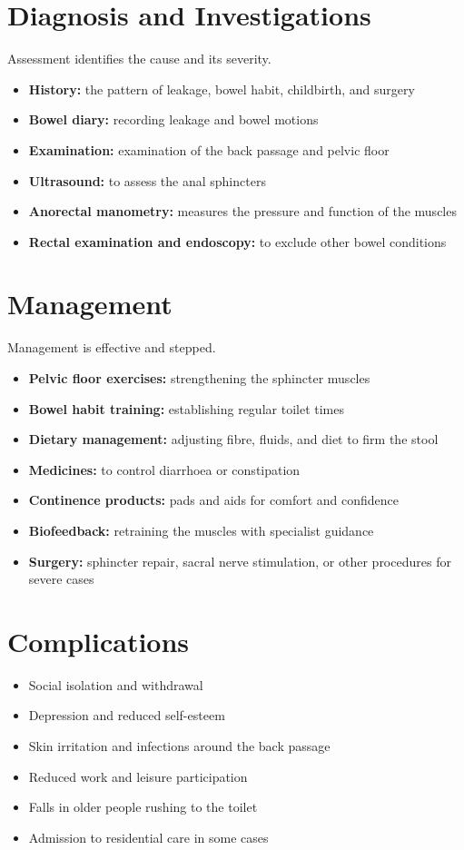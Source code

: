 \section*{Diagnosis and Investigations}
Assessment identifies the cause and its severity.
\begin{itemize}
    \item \textbf{History:} the pattern of leakage, bowel habit, childbirth, and surgery
    \item \textbf{Bowel diary:} recording leakage and bowel motions
    \item \textbf{Examination:} examination of the back passage and pelvic floor
    \item \textbf{Ultrasound:} to assess the anal sphincters
    \item \textbf{Anorectal manometry:} measures the pressure and function of the muscles
    \item \textbf{Rectal examination and endoscopy:} to exclude other bowel conditions
\end{itemize}

\section*{Management}
Management is effective and stepped.
\begin{itemize}
    \item \textbf{Pelvic floor exercises:} strengthening the sphincter muscles
    \item \textbf{Bowel habit training:} establishing regular toilet times
    \item \textbf{Dietary management:} adjusting fibre, fluids, and diet to firm the stool
    \item \textbf{Medicines:} to control diarrhoea or constipation
    \item \textbf{Continence products:} pads and aids for comfort and confidence
    \item \textbf{Biofeedback:} retraining the muscles with specialist guidance
    \item \textbf{Surgery:} sphincter repair, sacral nerve stimulation, or other procedures for severe cases
\end{itemize}

\section*{Complications}
\begin{itemize}
    \item Social isolation and withdrawal
    \item Depression and reduced self-esteem
    \item Skin irritation and infections around the back passage
    \item Reduced work and leisure participation
    \item Falls in older people rushing to the toilet
    \item Admission to residential care in some cases
\end{itemize}

